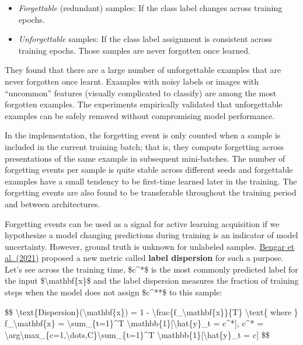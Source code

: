 \begin{itemize}
\tightlist
\item
  \emph{Forgettable} (redundant) samples: If the class label changes across training epochs.
\item
  \emph{Unforgettable} samples: If the class label assignment is consistent across training epochs. Those samples are never forgotten once learned.
\end{itemize}

They found that there are a large number of unforgettable examples that are never forgotten once learnt. Examples with noisy labels or images with ``uncommon'' features (visually complicated to classify) are among the most forgotten examples. The experiments empirically validated that unforgettable examples can be safely removed without compromising model performance.

In the implementation, the forgetting event is only counted when a sample is included in the current training batch; that is, they compute forgetting across presentations of the same example in subsequent mini-batches. The number of forgetting events per sample is quite stable across different seeds and forgettable examples have a small tendency to be first-time learned later in the training. The forgetting events are also found to be transferable throughout the training period and between architectures.

Forgetting events can be used as a signal for active learning acquisition if we hypothesize a model changing predictions during training is an indicator of model uncertainty. However, ground truth is unknown for unlabeled samples. \href{https://arxiv.org/abs/2107.14707}{Bengar et al. (2021)} proposed a new metric called \textbf{label dispersion} for such a purpose. Let's see across the training time, \$c\^{}*\$ is the most commonly predicted label for the input \$\textbackslash mathbf\{x\}\$ and the label dispersion measures the fraction of training steps when the model does not assign \$c\^{}**\$ to this sample:

\$\$ \textbackslash text\{Dispersion\}(\textbackslash mathbf\{x\}) = 1 - \textbackslash frac\{f\_\textbackslash mathbf\{x\}\}\{T\} \textbackslash text\{ where \} f\_\textbackslash mathbf\{x\} = \textbackslash sum\_\{t=1\}\^{}T \textbackslash mathbb\{1\}{[}\textbackslash hat\{y\}\_t = c\^{}*{]}, c\^{}* = \textbackslash arg\textbackslash max\_\{c=1,\textbackslash dots,C\}\textbackslash sum\_\{t=1\}\^{}T \textbackslash mathbb\{1\}{[}\textbackslash hat\{y\}\_t = c{]} \$\$

